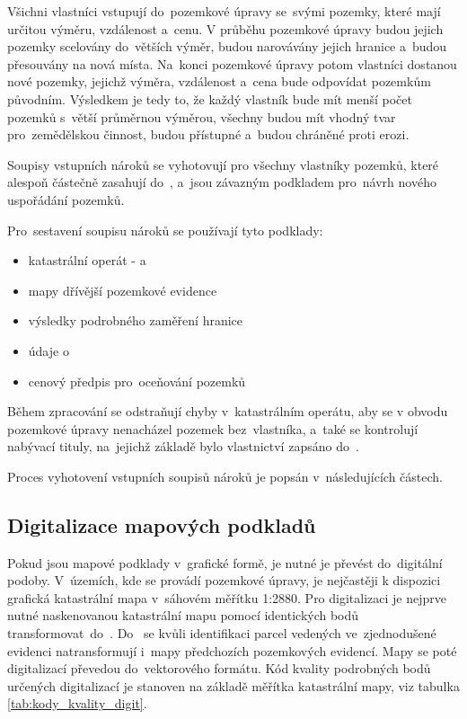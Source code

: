 Všichni vlastníci vstupují do~pozemkové úpravy se~svými pozemky, které mají určitou výměru, vzdálenost a~cenu. V průběhu pozemkové úpravy budou jejich pozemky scelovány do~větších výměr, budou narovávány jejich hranice a~budou přesouvány na nová místa. Na~konci pozemkové úpravy potom vlastníci dostanou nové pozemky, jejichž výměra, vzdálenost a~cena bude odpovídat pozemkům původním. Výsledkem je tedy to, že každý vlastník bude mít menší počet pozemků s~větší průměrnou výměrou, všechny budou mít vhodný tvar pro~zemědělskou činnost, budou přístupné a~budou chráněné proti erozi.

Soupisy vstupních nároků se vyhotovují pro všechny vlastníky pozemků, které alespoň částečně zasahují do~, a~jsou závazným podkladem pro~návrh nového uspořádání pozemků.

Pro~sestavení soupisu nároků se používají tyto podklady:
	\begin{itemize}[leftmargin=1.5cm, noitemsep]
		\item katastrální operát -  a~
		\item mapy dřívější pozemkové evidence
		\item výsledky podrobného zaměření hranice 
		\item údaje o~
		\item cenový předpis pro~oceňování pozemků
	\end{itemize}

Během zpracování  se odstraňují chyby v~katastrálním operátu, aby se v obvodu pozemkové úpravy nenacházel pozemek bez~vlastníka, a~také se kontrolují nabývací tituly, na~jejichž základě bylo vlastnictví zapsáno do~.

Proces vyhotovení vstupních soupisů nároků je popsán v~následujících částech.

\subsection{Digitalizace mapových podkladů}
\label{digitalizace}

Pokud jsou mapové podklady v~grafické formě, je nutné je převést do~digitální podoby. V~územích, kde se provádí pozemkové úpravy, je nejčastěji k dispozici grafická katastrální mapa v~sáhovém měřítku 1:2880. Pro digitalizaci je nejprve nutné naskenovanou katastrální mapu pomocí identických bodů transformovat\ do~. Do~ se kvůli identifikaci parcel vedených ve~zjednodušené evidenci natransformují i~mapy předchozích pozemkových evidencí. Mapy se poté digitalizací převedou do~vektorového formátu. Kód kvality podrobných bodů určených digitalizací je stanoven na základě měřítka katastrální mapy, viz tabulka \ref{tab:kody_kvality_digit}.

